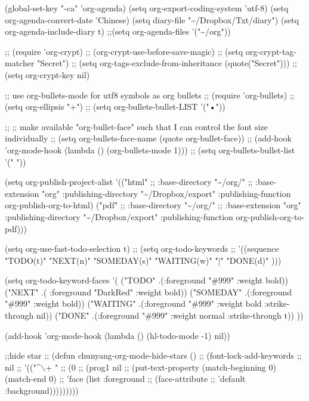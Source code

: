 \documentclass[presentation]{beamer}
\begin{document}
(global-set-key "\C-ca" 'org-agenda)
(setq org-export-coding-system 'utf-8)
(setq org-agenda-convert-date 'Chinese)
(setq diary-file "\textasciitilde{}/Dropbox/Txt/diary")
(setq org-agenda-include-diary t)
;;(setq org-agenda-files '("\textasciitilde{}/org"))


;; (require 'org-crypt)
;; (org-crypt-use-before-save-magic)
;; (setq org-crypt-tag-matcher "Secret")
;; (setq org-tags-exclude-from-inheritance (quote("Secret")))
;; (setq org-crypt-key nil)

;; use org-bullets-mode for utf8 symbols as org bullets
;; (require 'org-bullets)
;; (setq org-ellipsis "+")
;; (setq org-bullets-bullet-LIST '("•"))


;; ;; make available "org-bullet-face" such that I can control the font size individually
;; (setq org-bullets-face-name (quote org-bullet-face))
;; (add-hook 'org-mode-hook (lambda () (org-bullets-mode 1)))
;; (setq org-bullets-bullet-list '(" "))


(setq org-publish-project-alist
      '(("html"
         ;; :base-directory "\textasciitilde{}/org/"
         ;; :base-extension "org"
         :publishing-directory "\textasciitilde{}/Dropbox/export"
         :publishing-function org-publish-org-to-html)
        ("pdf"
         ;; :base-directory "\textasciitilde{}/org/"
         ;; :base-extension "org"
         :publishing-directory "\textasciitilde{}/Dropbox/export"
         :publishing-function org-publish-org-to-pdf)))

(setq org-use-fast-todo-selection t)
;; (setq org-todo-keywords
;;       '((sequence "TODO(t)" "NEXT(n)" "SOMEDAY(s)" "WAITING(w)" "|" "DONE(d)" )))

(setq org-todo-keyword-faces
      '(
        ("TODO" .(:foreground "\#999" :weight bold))
        ("NEXT" .( :foreground "DarkRed" :weight bold))
        ("SOMEDAY" .(:foreground "\#999" :weight bold))
        ("WAITING" .(:foreground "\#999" :weight bold :strike-through nil))
        ("DONE" .(:foreground "\#999" :weight normal :strike-through t))
        ))


(add-hook 'org-mode-hook (lambda () (hl-todo-mode -1) nil))

;;hide star
;; (defun chunyang-org-mode-hide-stars ()
;;   (font-lock-add-keywords
;;    nil
;;    '(("\^{}$\backslash$\*+ "
;;       (0
;;        (prog1 nil
;;          (put-text-property (match-beginning 0) (match-end 0)
;;                             'face (list :foreground
;;                                         (face-attribute
;;                                          'default :background)))))))))
\end{document}

